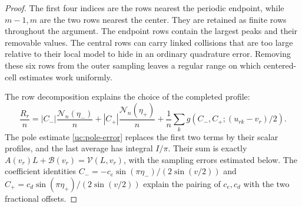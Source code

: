 \begin{proof}
The first four indices are the rows nearest the periodic endpoint,
while $m-1,m$ are the two rows nearest the center. They are retained
as finite rows throughout the argument. The endpoint rows contain the
largest peaks and their removable values. The central rows can carry
linked collisions that are too large relative to their local model to
hide in an ordinary quadrature error. Removing these six rows from
the outer sampling leaves a regular range on which centered-cell
estimates work uniformly.

The row decomposition explains the choice of the completed profile:
\[
 \frac{R_r}{n}=|C_-|\frac{\mathcal N_n(\eta_-)}n
             +|C_+|\frac{\mathcal N_n(\eta_+)}n
             +\frac1n\sum_k g(C_-,C_+;(u_{rk}-v_r)/2).
\]
The pole estimate \eqref{uc:pole-error} replaces the first two terms by
their scalar profiles, and the last average has integral $I/\pi$.
Their sum is exactly $A(v_r)L+\mathcal B(v_r)=\mathcal V(L,v_r)$,
with the sampling errors estimated below. The coefficient identities
$C_-=-c_e\sin(\pi\eta_-)/(2\sin(v/2))$ and
$C_+=c_d\sin(\pi\eta_+)/(2\sin(v/2))$ explain the pairing of
$c_e,c_d$ with the two fractional offsets.


\end{proof}

